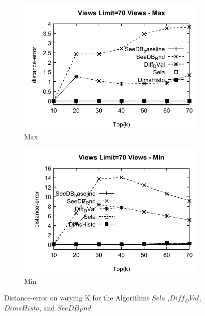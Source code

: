   
\begin{figure}[h]
  \centering
  \begin{subfigure}[b]{0.42\textwidth}
    \includegraphics[width=\textwidth]{MaxD1.pdf}
    \caption{Max   }
        \label{fig:MaxD1}%
  \end{subfigure}
  \begin{subfigure}[b]{0.42\textwidth}
    \includegraphics[width=\textwidth]{MinD1.pdf}
     \caption{Min  }
        \label{fig:MinD1}
  \end{subfigure}
  
  \caption{Distance-error on varying K for the Algorithms $Sela$ ,$Diff_DVal$, $DimsHisto$, and $SeeDB_Rnd$}
\end{figure}